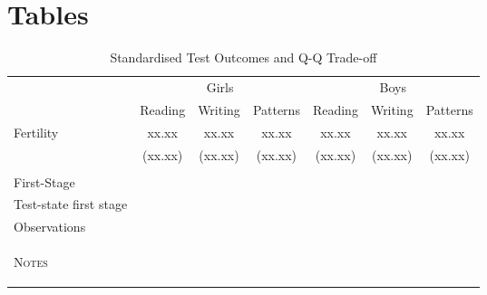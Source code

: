 \documentclass[a4paper, 11pt]{article}
\theoremstyle{plain}
\begin{document}
\clearpage

\section{Tables}
\begin{landscape}
\begin{table}[htpb!]
  \begin{center}
    \caption{Standardised Test Outcomes and Q-Q Trade-off}
    \begin{tabular}{lcccccc} \toprule
     & \multicolumn{3}{c}{Girls} & \multicolumn{3}{c}{Boys} \\ \cmidrule(r){2-4} \cmidrule(r){5-7}
     & Reading & Writing & Patterns & Reading & Writing & Patterns \\ \midrule
      Fertility & xx.xx & xx.xx & xx.xx & xx.xx & xx.xx & xx.xx \\
                & (xx.xx) & (xx.xx) & (xx.xx) & (xx.xx) & (xx.xx) & (xx.xx) \\
       & & & & & & \\
      \midrule
      First-Stage        & & & & & & \\
      Test-state first stage        & & & & & & \\
      Observations       & & & & &  & \\
      \bottomrule
      \multicolumn{7}{p{10cm}}{\begin{footnotesize}\textsc{Notes}  \end{footnotesize}}
    \end{tabular}
  \end{center}
\end{table}
\end{landscape}


\clearpage

\begin{landscape}
	
\end{landscape}

\clearpage

\begin{landscape}
	
\end{landscape}

\clearpage

\end{document}
